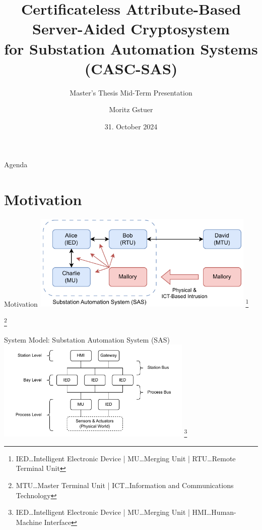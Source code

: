 \documentclass[en]{sdqbeamer}
\title[ABAC for Substations]{Certificateless Attribute-Based Server-Aided Cryptosystem\\for Substation Automation Systems (CASC-SAS)}
\subtitle{Master's Thesis Mid-Term Presentation}
\author[Moritz Gstuer]{Moritz Gstuer}
\date[31.\,10.\,2024]{31. October 2024}
\newcommand\nonumberfootnote[1]{%
  \begingroup
  \renewcommand\thefootnote{}\footnote{#1}%
  \addtocounter{footnote}{-1}%
  \endgroup
}
\begin{document}
 
\KITtitleframe

\begin{frame}{Agenda}
\tableofcontents
\end{frame}

\section{Motivation}
\begin{frame}{Motivation}
    \centering
	\includegraphics[width=0.8\textwidth]{./figures/sas_intrusion.drawio.pdf}
    \nonumberfootnote{IED\dots Intelligent Electronic Device | MU\dots Merging Unit | RTU\dots Remote Terminal Unit}
    \nonumberfootnote{MTU\dots Master Terminal Unit | ICT\dots Information and Communications Technology}
\end{frame}
\begin{frame}{System Model: Substation Automation System (SAS)}
    \centering
    \includegraphics[width=0.7\textwidth]{./figures/substation_architecture.drawio.pdf}
    \nonumberfootnote{IED\dots Intelligent Electronic Device | MU\dots Merging Unit | HMI\dots Human-Machine Interface}
\end{frame}
\end{document}
